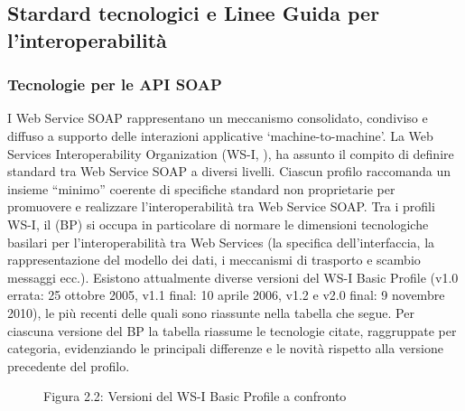 \documentclass[letterpaper,10pt,italian]{sphinxmanual}
\begin{document}
\subsection{Stardard tecnologici e Linee Guida per l’interoperabilità}
\label{\detokenize{sez21:stardard-tecnologici-e-linee-guida-per-l-interoperabilita}}\label{\detokenize{sez21:sezione212}}

\subsubsection{Tecnologie per le API SOAP}
\label{\detokenize{sez21:tecnologie-per-le-api-soap}}\label{\detokenize{sez21:sezione2121}}
I Web Service SOAP rappresentano un meccanismo consolidato, condiviso e diffuso a supporto delle interazioni applicative ‘machine-to-machine’.
La Web Services Interoperability Organization (WS-I, ), ha assunto il compito di definire  standard tra Web Service SOAP a diversi livelli. Ciascun profilo raccomanda un insieme “minimo” coerente di specifiche standard non proprietarie per promuovere e realizzare l’interoperabilità tra Web Service SOAP.
Tra i profili WS-I, il  (BP) si occupa in particolare di normare le dimensioni tecnologiche basilari per l’interoperabilità tra Web Services  (la specifica dell’interfaccia, la rappresentazione del modello dei dati, i meccanismi di trasporto e scambio messaggi ecc.).
Esistono attualmente diverse versioni del WS-I Basic Profile (v1.0 errata: 25 ottobre 2005, v1.1 final: 10 aprile 2006, v1.2 e v2.0 final: 9 novembre 2010), le più recenti delle quali sono riassunte nella tabella che segue.
Per ciascuna versione del BP la tabella riassume le tecnologie citate, raggruppate per categoria, evidenziando le principali differenze e le novità rispetto alla versione precedente del profilo.

\begin{figure}[htbp]
\centering
\capstart

\noindent{}
\caption{Figura 2.2: Versioni del WS-I Basic Profile a confronto}\label{\detokenize{sez21:id2}}\end{figure}

\end{document}
